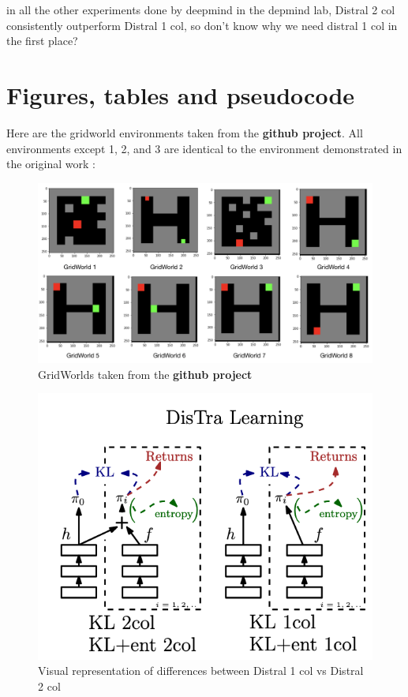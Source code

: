 \documentclass[12pt]{report}
\begin{document}
in all the other experiments done by deepmind in the depmind lab, Distral 2 col consistently outperform Distral 1 col, so don't know why we need distral 1 col in the first place?\\

\appendix




\chapter{Figures, tables and pseudocode}

Here are the gridworld environments taken from the \textbf{github project}. All environments except 1, 2, and 3 are identical to the environment demonstrated in the original work \cite{teh2017distral}:
\begin{figure}[H]
    \center
    \includegraphics[width=0.7\linewidth]{figs/GridWorlds.png}
    \caption{GridWorlds taken from the \textbf{github project}}
    \label{fig:gridworlds}
\end{figure}
\begin{figure}[H]
    \center
    \includegraphics[width=0.45\linewidth]{figs/distral1_2_diagram.png}
    \caption{Visual representation of differences between Distral 1 col vs Distral 2 col}
    \label{fig:distral12}
\end{figure}
\end{document}
